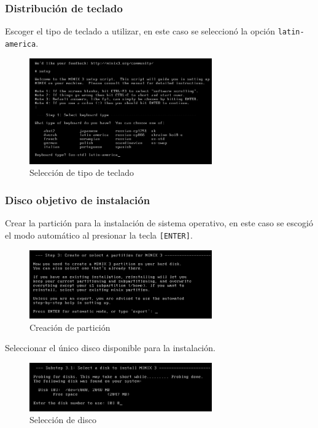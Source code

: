 \documentclass[12pt]{scrartcl}
\begin{document}
\subsubsection{Distribución de teclado}
Escoger el tipo de teclado a utilizar, en este caso se seleccionó la opción \texttt{latin-america}.
\begin{figure}[H]
  \centering
  \includegraphics[width=0.7\textwidth]{vm/min19.png}
  \caption{Selección de tipo de teclado}
\end{figure}

\subsubsection{Disco objetivo de instalación}
Crear la partición para la instalación de sistema operativo, en este caso se escogió el modo automático al presionar la tecla \texttt{[ENTER]}.
\begin{figure}[H]
  \centering
  \includegraphics[width=0.7\textwidth]{vm/min20.png}
  \caption{Creación de partición}
\end{figure}

Seleccionar el único disco disponible para la instalación.
\begin{figure}[H]
  \centering
  \includegraphics[width=0.7\textwidth]{vm/min21.png}
  \caption{Selección de disco}
\end{figure}
\end{document}
